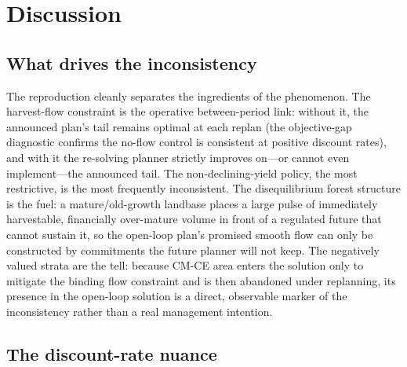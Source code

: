 \section{Discussion}

\hypertarget{what-drives-the-inconsistency}{%
\subsection{What drives the inconsistency}\label{what-drives-the-inconsistency}}

The reproduction cleanly separates the ingredients of the phenomenon. The harvest-flow constraint is the operative between-period link: without it, the announced plan's tail remains optimal at each replan (the objective-gap diagnostic confirms the no-flow control is consistent at positive discount rates), and with it the re-solving planner strictly improves on---or cannot even implement---the announced tail. The non-declining-yield policy, the most restrictive, is the most frequently inconsistent. The disequilibrium forest structure is the fuel: a mature/old-growth landbase places a large pulse of immediately harvestable, financially over-mature volume in front of a regulated future that cannot sustain it, so the open-loop plan's promised smooth flow can only be constructed by commitments the future planner will not keep. The negatively valued strata are the tell: because CM-CE area enters the solution only to mitigate the binding flow constraint and is then abandoned under replanning, its presence in the open-loop solution is a direct, observable marker of the inconsistency rather than a real management intention.

\hypertarget{the-discount-rate-nuance}{%
\subsection{The discount-rate nuance}\label{the-discount-rate-nuance}}

